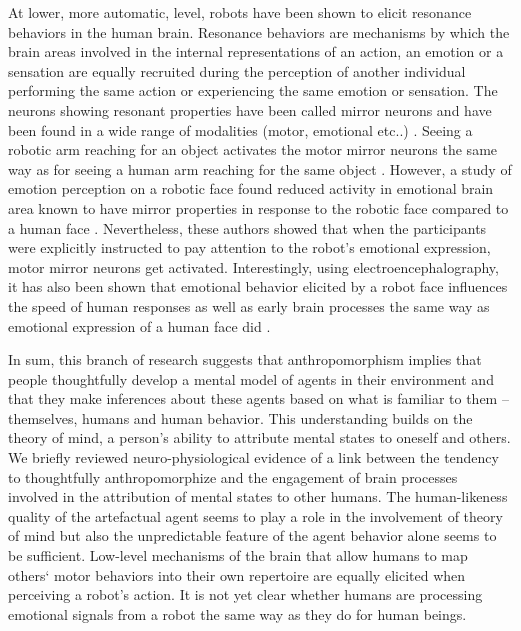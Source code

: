 \documentclass{frontiersSCNS} %
\begin{document}
At lower, more automatic, level, robots have been shown to elicit resonance behaviors in the
human brain. Resonance behaviors \citep{Rizzolatti1999} are mechanisms by which the brain areas involved in the internal representations of an action, an emotion or a sensation are equally recruited during the perception of another individual performing the same action or experiencing the same emotion or sensation.  
The neurons showing resonant properties have been called mirror neurons and
have been found in a wide range of modalities (motor, emotional etc..)
. Seeing a robotic arm reaching for an object activates the motor mirror neurons the same way as for seeing a human arm reaching for the same object
\citep{Gazzola2007, oberman_eeg_2007}. However, a study of emotion perception
on a robotic face found reduced activity in emotional brain
area known to have mirror properties in response to the robotic face compared to
a human face \citep{Chaminade2010}. Nevertheless, these authors showed that when
the participants were explicitly instructed to pay attention to the robot's
emotional expression, motor mirror neurons get activated.
Interestingly, using electroencephalography,  it has also been shown that
emotional behavior elicited by a robot face influences the speed of human
responses as well as early brain processes the same way as emotional expression
of a human face did \citep{Dubal2010}.


%


In sum, this branch of research suggests that anthropomorphism implies that
people thoughtfully develop a mental model of agents in their environment and
that they make inferences about these agents based on what is familiar to them
-- themselves, humans and human behavior. This understanding builds on the
theory of mind,  a
person's ability to attribute mental states to oneself and others. 
We briefly reviewed  neuro-physiological evidence of a link between the tendency
to thoughtfully anthropomorphize and the engagement of brain processes involved
in the attribution of mental states to other humans. The human-likeness quality
of the artefactual agent seems to play a role in the involvement of theory of
mind but also the unpredictable feature of the agent behavior alone seems to be
sufficient. Low-level mechanisms of the brain that allow humans to map others`
motor behaviors into their own repertoire are equally elicited when perceiving a
robot's action. It is not yet clear whether humans are processing emotional
signals from a robot the same way as they do for human beings. 
\end{document}
